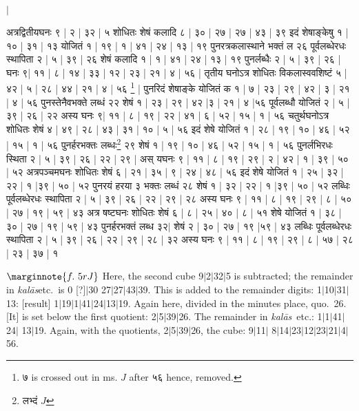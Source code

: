 \documentclass[12pt]{book}
\def\kalas{\textit{ka\-l\=as}}
\def\danda{$|$}
\begin{document}
\newpage

{\s $|$ 


अत्रद्वितीयघनः ९ | २ | ३२ | ५ शोधितः शेषं कलादि ८ | ३० | २७ | २७ | ४३ | ३९ इदं शेषाङ्केषु १ |
१० | ३१ | १३ योजितं १ | १९ | १ | ४१ | २४ | १३ | १९ पुनरत्रकलास्थाने भक्तं ल २६ पूर्वलब्धेरधः
स्थापिता २ | ५ | ३९ | २६ शेषं कलादि १ | १ | ४१ | २४ | १३ | १९ पुनर्लब्धैः २ | ५ | ३९ | २६ | घनः ९| ११ |
८ | १४ | ३३ | १२ | २३ | २१ | ४ | ५६ | 
तृतीय घनोऽत्र शोधितः विकलास्ववशिष्टं ५ | ४२ | ५ | २८ | ४४ | २१ | ४ |
५६ \footnote{{\s ७} is crossed out in ms. $J$ after {\s ५६} hence, removed.} | पुनरिदं शेषाङ्के योजितं क १ | ७ | २३ | २९ | ४२ | ३ | २१ | ४ | ५६ पुनस्तेनैवभक्ते लब्धं
२२ शेषं १ | २३ | २९ | ४२ |३ | २१ | ४ |५६ पूर्वलब्धौ योजितं २ | ५ | ३९ | २६ | २२ अस्य घनः ९| ११ | ८ |
१९ | २२ | ४१ | ६ | ५२ | १५ | १ | ५६ चतुर्थघनोऽत्र शोधितः शेषं ४ | ४९ | २८ | ४३ | ३१ | १० | ५ | ५६ इदं
शेषे योजितं १ | २८ | १९ | १० | ४६ | ५२ | १५ | १ | ५६ पुनर्हरभक्तः लब्धः\footnote{{\s लभ्दं} $J$} २९ शेषं १ | १९ | १० | ४६
| ५२ | १५ | १ | ५६ पुनर्लभिरधः स्थिता २ | ५ | ३९ | २६ | २२ | २९ | अस् यघनः ९ | ११ | ८ | १९ | २९ | २ | ४२ | १
| ३९ | ५० | ५२ अत्रपञ्चमघनः शोधितः शेषं ६ | २१ | ३५ | ९ | २४ | ४८ | ५६ इदं शेषे योजितं
१ | २५ | ३२ | २२ | १ |३९ | ५० | ५२ पुनरयं हरया ३ भक्तः लब्धं २८ शेषं १ | ३२ | २२ | १ |३९ | ५० |
५२ लब्धिः पूर्वलब्धेरधः स्थापिता २ | ५ | ३९ | २६ | २२ | २९ | २८ अस्य घनः ९ | ११ | ८ | १९ | २९ | ८ | ५०
| २७ | १९ | ५९ | ४३ अत्र षष्टघनः शोधितः शेषं ६ | ८ | २५ | ४० | ८ | ५१ शेषे योजितं १ | ३८ | ३० |
२७ | १९ | ५९ | ४३ पुनर्हरभक्तं लब्ध ३२$|$
शेषं २ | ३० | २७ | १९ |५९ | ४३ लब्धिः पूर्वलब्धेरधः
स्थापिता २ | ५ | ३९ | २६ | २२ | २९ | २८ | ३२ अस्य घनः ९ | ११ | ८ | १९ | २९ | ८ | ५७ | २८ | २३ | ३७ | १}

\newpage

$\marginnote{f.~5r J}$
Here, the second cube 9\danda 2\danda 32\danda 5 is subtracted; the remainder in \kalas etc.\ 
is 0 [?]\danda 30 27\danda 27\danda 43\danda 39. This is added to the remainder digits:
1\danda 10\danda 31\danda 13: [result] 1\danda 19\danda 1\danda 41\danda 24\danda 13\danda 19.
Again here, divided in the minutes place, quo.\ 26. [It] is set below the first quotient: 
2\danda 5\danda 39\danda 26. The remainder in \kalas\ etc.: 1\danda 1\danda 41\danda 24\danda
13\danda 19. Again, with the quotients, 2\danda 5\danda 39\danda 26, the cube: 9\danda 11\danda
8\danda 14\danda 23\danda 12\danda 23\danda 21\danda 4\danda 56.
\end{document}
